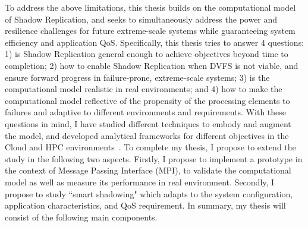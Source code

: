 To address the above limitations, this thesis builds on the computational model of Shadow Replication, and seeks to simultaneously address the power and resilience challenges for future extreme-scale systems while guaranteeing system efficiency and application QoS.
Specifically, this thesis tries to answer 4 questions: 1) is Shadow Replication general enough to achieve objectives beyond time to completion; %
2) how to enable Shadow Replication when DVFS is not viable, and ensure forward progress in failure-prone, extreme-scale systems; 3) is the computational model realistic in real environments; and 4) how to make the computational model reflective of the propensity of the processing elements to failures and adaptive to different environments and requirements.
With these questions in mind, 
I have studied different techniques to embody and augment the model, and developed analytical frameworks for different objectives in the Cloud and HPC environments~\cite{cui_2014_closer,cui_en7085151,cui_2016_scalcom}.
To complete my thesis, I propose to extend the study in the following two aspects.
Firstly, I propose to implement a prototype in the context of Message Passing Interface (MPI), to validate the 
computational model as well as measure its performance in real environment. Secondly, I propose to study  
``smart shadowing" which adapts to the system configuration, application characteristics, and QoS requirement.
In summary, my thesis will consist of the following main components.



